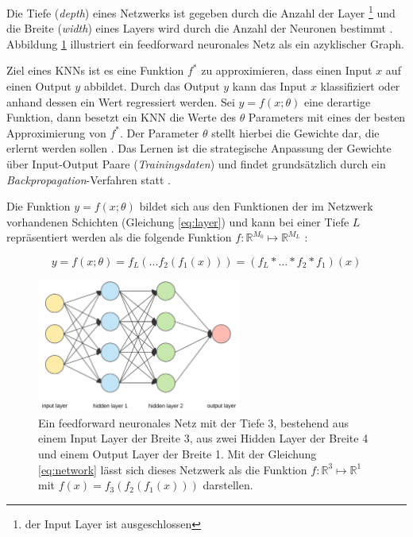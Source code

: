 Die Tiefe (\textit{depth}) eines Netzwerks ist gegeben durch die Anzahl der Layer \footnote{der Input Layer ist ausgeschlossen} und die Breite (\textit{width}) eines Layers wird durch die Anzahl der Neuronen bestimmt \cite{Goodfellow-et-al-2016}. 
Abbildung \ref{fig:neural_net} illustriert ein feedforward neuronales Netz als ein azyklischer Graph.

Ziel eines KNNs ist es eine Funktion $f^*$ zu approximieren, dass einen Input $x$ auf einen Output $y$ abbildet. Durch das Output $y$ kann das Input $x$ klassifiziert oder anhand dessen ein Wert regressiert werden. Sei $y = f(x; \theta)$ eine derartige Funktion, dann besetzt ein KNN die Werte des $\theta$ Parameters mit eines der besten Approximierung von $f^*$. Der Parameter $\theta$ stellt hierbei die Gewichte dar, die erlernt werden sollen \cite{Goodfellow-et-al-2016}. 
Das Lernen ist die strategische Anpassung der Gewichte über Input-Output Paare (\textit{Trainingsdaten}) und findet grundsätzlich durch ein \textit{Backpropagation}-Verfahren statt \cite{Goodfellow-et-al-2016}. 

Die Funktion $y = f(x; \theta)$ bildet sich aus den Funktionen der im Netzwerk vorhandenen Schichten (Gleichung \ref{eq:layer}) und kann bei einer Tiefe $L$ repräsentiert werden als die folgende Funktion $f :  \mathbb{R}^{M_0} \mapsto \mathbb{R}^{M_L}$ \cite{Goodfellow-et-al-2016, bauckhageInformedMachineLearning}:
 
\begin{equation}
\label{eq:network}
y = f(x; \theta)=  f_L(...f_2(f_1(x))) = (f_L * ... * f_2 * f_1)(x)
\end{equation}

\vspace*{1.5cm}

\begin{figure}[H]
	\centering
	\includegraphics[width=0.6\textwidth]{images/ann_conv/neural_net.png}
	\caption{Ein feedforward neuronales Netz mit der Tiefe 3, bestehend aus einem Input Layer der Breite 3, aus zwei Hidden Layer der Breite 4 und einem Output Layer der Breite 1. Mit der Gleichung \ref{eq:network}  lässt sich dieses Netzwerk als die Funktion $f :  \mathbb{R}^{3} \mapsto \mathbb{R}^{1}$ mit $f(x)=f_3(f_2(f_1(x)))$ darstellen. }
	\label{fig:neural_net}
\end{figure}

